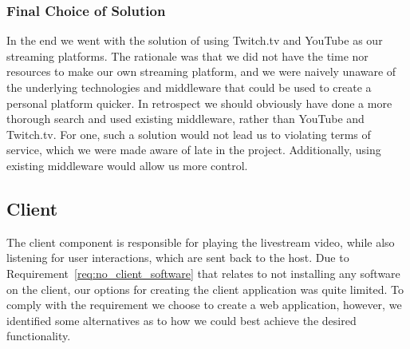 \subsubsection{Final Choice of Solution}
\label{par:stream_dist_final}
In the end we went with the solution of using Twitch.tv and YouTube as our streaming platforms. The rationale was that we did not have the time nor resources to make our own streaming platform, and we were naively unaware of the underlying technologies and middleware that could be used to create a personal platform quicker. In retrospect we should obviously have done a more thorough search and used existing middleware, rather than YouTube and Twitch.tv. For one, such a solution would not lead us to violating terms of service\cite[5.1 G]{youtube_guidelines}\cite[9 viii]{ twitch_guidelines}, which we were made aware of late in the project. Additionally, using existing middleware would allow us more control. 























\subsection{Client} %
The client component is responsible for playing the livestream video, while also listening for user interactions, which are sent back to the host.
Due to Requirement~\ref{req:no_client_software} that relates to not installing any software on the client, our options for creating the client application was quite limited. 
To comply with the requirement we choose to create a web application, however, we identified some alternatives as to how we could best achieve the desired functionality.

